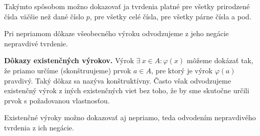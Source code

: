 Takýmto spôsobom možno dokazovať ja tvrdenia platné pre všetky prirodzené čísla
väčšie než dané číslo $p$, pre všetky celé čísla, pre všetky párne čísla a pod.

Pri nepriamom dôkaze všeobecného výroku odvodzujeme z jeho negácie nepravdivé tvrdenie.

\textbf{Dôkazy existenčných výrokov.} Výrok $\exists ~ x \in A: \varphi (x)$
môžeme dokázať tak, že priamo určíme (skonštruujeme) prvok $a \in A$, pre ktorý
je výrok $\varphi (a)$ pravdivý. Taký dôkaz sa nazýva konštruktívny. Často však
odvodzujeme existenčný výrok z iných existenčných viet bez toho, že by sme
skutočne určili prvok s požadovanou vlastnosťou.

Existenčné výroky možno dokazovať aj nepriamo, teda odvodením nepravdivého
tvrdenia z ich negácie.

